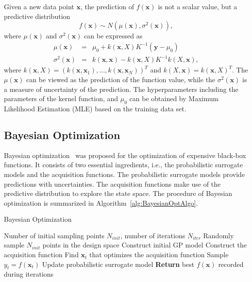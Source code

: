 Given a new data point $\bm{x}$, the prediction of $f(\bm{x})$ is
not a scalar value, but a predictive distribution
\begin{equation}
f(\bm{x}) \sim N(\mu(\bm{x}),
\sigma^2(\bm{x})),
\label{eq:GPRPred}
\end{equation}
where $\mu(\bm{x})$ and $\sigma^2(\bm{x})$ can be expressed as
\begin{equation}
        \begin{array}{lll}
            \mu(\bm{x})      &=& \mu_0 + k(\bm{x},X)K^{-1}(\bm{y} - \mu_0) \\
            \sigma^2(\bm{x}) &=& k(\bm{x}, \bm{x}) - k(\bm{x}, X)K^{-1}k(X, \bm{x}),
        \end{array}
    \label{eq:GPRPredEqNoisy}
\end{equation}
where $k(\bm{x}, X) = (k(\bm{x}, \bm{x}_1), \dots, k(\bm{x},
\bm{x}_N))^T$ and $k(X, \bm{x}) = k(\bm{x}, X)^T$. The
$\mu(\bm{x})$ can be viewed as the prediction of the function value, while
the $\sigma^2(\bm{x})$ is a measure of uncertainty of the prediction. The hyperparameters including the parameters of the kernel function, and $\mu_0$ can be obtained by Maximum Likelihood Estimation (MLE) based on the training data set. 

\subsection{Bayesian Optimization}

Bayesian optimization~\cite{shahriari2016taking} was proposed for the
optimization of expensive black-box functions. It consists of two essential
ingredients, i.e., the probabilistic surrogate models and the acquisition
functions. The probabilistic surrogate models provide predictions with
uncertainties. The acquisition functions make use of the predictive
distribution to explore the state space. The procedure of Bayesian optimization
is summarized in Algorithm~\ref{alg:BayesianOptAlgo}.


\begin{algorithm}
    \caption{Bayesian Optimization}
    \label{alg:BayesianOptAlgo}
    \begin{algorithmic}[1]
        \REQUIRE Number of initial sampling points $N_{init}$, number of iterations $N_{iter}$
        \STATE Randomly sample $N_{init}$ points in the design space
        \STATE Construct initial GP model
        \STATE Construct the acquisition function
        \STATE Find $\bm{x}_t$ that optimizes the acquisition function
        \STATE Sample $y_t = f(\bm{x}_t)$
        \STATE Update probabilistic surrogate model
        \ENDFOR
        \STATE \textbf{Return} best $f(\bm{x})$ recorded during iterations
    \end{algorithmic}
\end{algorithm}


